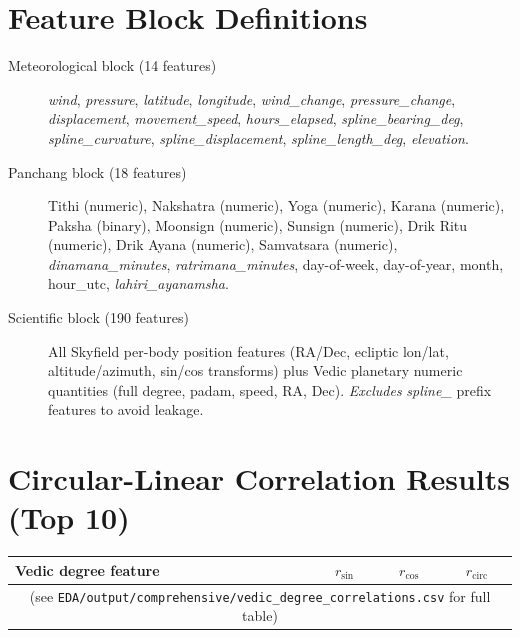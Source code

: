 \documentclass[12pt,a4paper]{article}
\begin{document}
\appendix
\section{Feature Block Definitions}
\label{app:blocks}

\begin{description}
  \item[Meteorological block (14 features)] \textit{wind}, \textit{pressure},
    \textit{latitude}, \textit{longitude}, \textit{wind\_change},
    \textit{pressure\_change}, \textit{displacement}, \textit{movement\_speed},
    \textit{hours\_elapsed}, \textit{spline\_bearing\_deg},
    \textit{spline\_curvature}, \textit{spline\_displacement},
    \textit{spline\_length\_deg}, \textit{elevation}.

  \item[Panchang block (18 features)] Tithi (numeric), Nakshatra (numeric),
    Yoga (numeric), Karana (numeric), Paksha (binary), Moonsign (numeric),
    Sunsign (numeric), Drik Ritu (numeric), Drik Ayana (numeric),
    Samvatsara (numeric), \textit{dinamana\_minutes}, \textit{ratrimana\_minutes},
    day-of-week, day-of-year, month, hour\_utc, \textit{lahiri\_ayanamsha}.

  \item[Scientific block (190 features)] All Skyfield per-body position features
    (RA/Dec, ecliptic lon/lat, altitude/azimuth, sin/cos transforms) plus
    Vedic planetary numeric quantities (full degree, padam, speed, RA, Dec).
    \emph{Excludes} \textit{spline\_} prefix features to avoid leakage.
\end{description}

\section{Circular-Linear Correlation Results (Top 10)}
\label{app:circular}

\begin{center}
\begin{tabular}{lccc}
\toprule
\textbf{Vedic degree feature} & $r_{\sin}$ & $r_{\cos}$ & $r_{\text{circ}}$ \\
\midrule
\multicolumn{4}{c}{\small (see \texttt{EDA/output/comprehensive/vedic\_degree\_correlations.csv} for full table)} \\
\bottomrule
\end{tabular}
\end{center}
\end{document}
